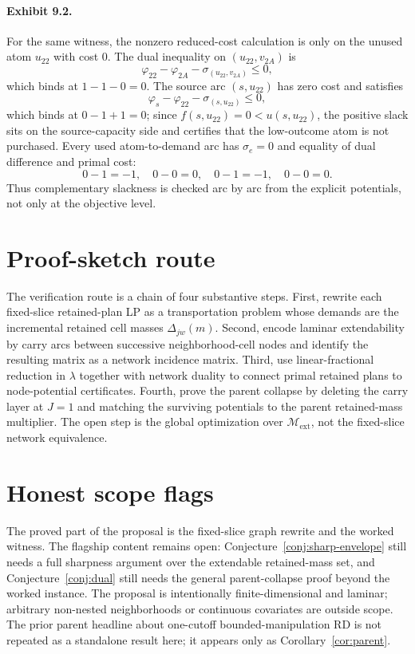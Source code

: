 \documentclass[11pt]{article}
\newcommand{\calM}{\mathcal{M}}
\theoremstyle{definition}
\theoremstyle{plain}
\theoremstyle{remark}
\begin{document}
\paragraph{Exhibit 9.2.}
For the same witness, the nonzero reduced-cost calculation is only on the unused atom
\(u_{22}\) with cost \(0\). The dual inequality on \((u_{22},v_{2A})\) is
\[
\varphi_{22}-\varphi_{2A}-\sigma_{(u_{22},v_{2A})}\le 0,
\]
which binds at \(1-1-0=0\). The source arc \((s,u_{22})\) has zero cost and satisfies
\[
\varphi_s-\varphi_{22}-\sigma_{(s,u_{22})}\le 0,
\]
which binds at \(0-1+1=0\); since \(f(s,u_{22})=0<u(s,u_{22})\), the positive slack sits
on the source-capacity side and certifies that the low-outcome atom is not purchased. Every
used atom-to-demand arc has \(\sigma_e=0\) and equality of dual difference and primal cost:
\[
0-1=-1,\quad 0-0=0,\quad 0-1=-1,\quad 0-0=0.
\]
Thus complementary slackness is checked arc by arc from the explicit potentials, not only
at the objective level.

\section{Proof-sketch route}
The verification route is a chain of four substantive steps. First, rewrite each fixed-slice
retained-plan LP as a transportation problem whose demands are the incremental retained
cell masses \(\Delta_{jw}(m)\). Second, encode laminar extendability by carry arcs between
successive neighborhood-cell nodes and identify the resulting matrix as a network incidence
matrix. Third, use linear-fractional reduction in \(\lambda\) together with network duality
to connect primal retained plans to node-potential certificates. Fourth, prove the parent
collapse by deleting the carry layer at \(J=1\) and matching the surviving potentials to
the parent retained-mass multiplier. The open step is the global optimization over
\(\calM_{\mathrm{ext}}\), not the fixed-slice network equivalence.

\section{Honest scope flags}
The proved part of the proposal is the fixed-slice graph rewrite and the worked witness.
The flagship content remains open: Conjecture~\ref{conj:sharp-envelope} still needs a full
sharpness argument over the extendable retained-mass set, and
Conjecture~\ref{conj:dual} still needs the general parent-collapse proof beyond the worked
instance. The proposal is intentionally finite-dimensional and laminar; arbitrary
non-nested neighborhoods or continuous covariates are outside scope. The prior parent
headline about one-cutoff bounded-manipulation RD is not repeated as a standalone result
here; it appears only as Corollary~\ref{cor:parent}.
\end{document}

